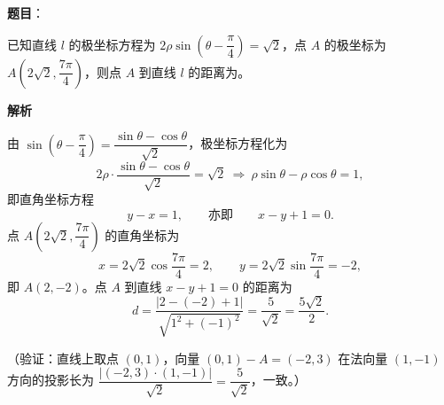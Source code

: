 \begin{answer}

\textbf{题目}：

已知直线 \(l\) 的极坐标方程为 \(2\rho\sin\left(\theta-\dfrac{\pi}{4}\right)=\sqrt{2}\)，点 \(A\) 的极坐标为 \(A\left(2\sqrt{2},\dfrac{7\pi}{4}\right)\)，则点 \(A\) 到直线 \(l\) 的距离为\gkblank{}。

\textbf{解析}

由 \(\sin\left(\theta-\dfrac{\pi}{4}\right)=\dfrac{\sin\theta-\cos\theta}{\sqrt2}\)，极坐标方程化为
\nopagebreak[4]
\[
2\rho\cdot\frac{\sin\theta-\cos\theta}{\sqrt2}=\sqrt2
\ \Longrightarrow\ \rho\sin\theta-\rho\cos\theta=1,
\]
即直角坐标方程
\nopagebreak[4]
\[
y-x=1,\qquad\text{亦即}\qquad x-y+1=0.
\]
点 \(A\left(2\sqrt2,\dfrac{7\pi}{4}\right)\) 的直角坐标为
\nopagebreak[4]
\[
x=2\sqrt2\cos\frac{7\pi}{4}=2,\qquad
y=2\sqrt2\sin\frac{7\pi}{4}=-2,
\]
即 \(A(2,-2)\)。点 \(A\) 到直线 \(x-y+1=0\) 的距离为
\nopagebreak[4]
\[
d=\frac{|2-(-2)+1|}{\sqrt{1^2+(-1)^2}}=\frac{5}{\sqrt2}=\frac{5\sqrt2}{2}.
\]

（验证：直线上取点 \((0,1)\)，向量 \((0,1)-A=(-2,3)\) 在法向量 \((1,-1)\) 方向的投影长为 \(\dfrac{|(-2,3)\cdot(1,-1)|}{\sqrt2}=\dfrac{5}{\sqrt2}\)，一致。）


\end{answer}
